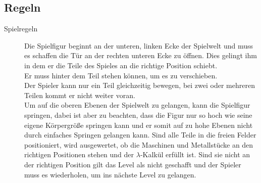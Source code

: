 \documentclass{scrartcl}
\begin{document}
\subsection{Regeln}

\begin{description}
	\item[Spielregeln] Die Spielfigur beginnt an der unteren, linken Ecke der Spielwelt und muss es schaffen die Tür an der rechten unteren Ecke zu öffnen. Dies gelingt ihm in dem er die Teile des Spieles an die richtige Position schiebt.\\
	Er muss hinter dem Teil stehen können, um es zu verschieben. \\
	Der Spieler kann nur ein Teil gleichzeitig bewegen, bei zwei oder mehreren Teilen kommt er nicht weiter voran. \\
	Um auf die oberen Ebenen der Spielwelt zu gelangen, kann die Spielfigur springen, dabei ist aber zu beachten, dass die Figur nur so hoch wie seine eigene Körpergröße springen kann und er somit auf zu hohe Ebenen nicht durch einfaches Springen gelangen kann. 
	Sind alle Teile in die freien Felder positioniert, wird ausgewertet, ob die Maschinen und Metallstücke an den richtigen Positionen stehen und der $\lambda$-Kalkül erfüllt ist. Sind sie nicht an der richtigen Position gilt das Level als nicht geschafft und der Spieler muss es wiederholen, um ins nächste Level zu gelangen. \\
	

\end{description}
\end{document}
